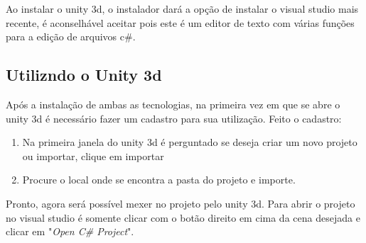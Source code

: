   Ao instalar o unity 3d, o instalador dará
a opção de instalar o visual studio mais recente, é aconselhável aceitar pois este é um editor de texto com várias funções para a edição
de arquivos c\#.

\subsection{Utilizndo o Unity 3d}
  Após a instalação de ambas as tecnologias, na primeira vez em que se abre o unity 3d é necessário fazer um cadastro para sua utilização. Feito
o cadastro:
\begin{enumerate}
  \item Na primeira janela do unity 3d é perguntado se deseja criar um novo projeto ou importar, clique em importar
  \item Procure o local onde se encontra a pasta do projeto e importe.
\end{enumerate}

  Pronto, agora será possível mexer no projeto pelo unity 3d. Para abrir o projeto no visual studio é somente clicar com o botão direito em cima
da cena desejada e clicar em "\textit{Open C\# Project}".
